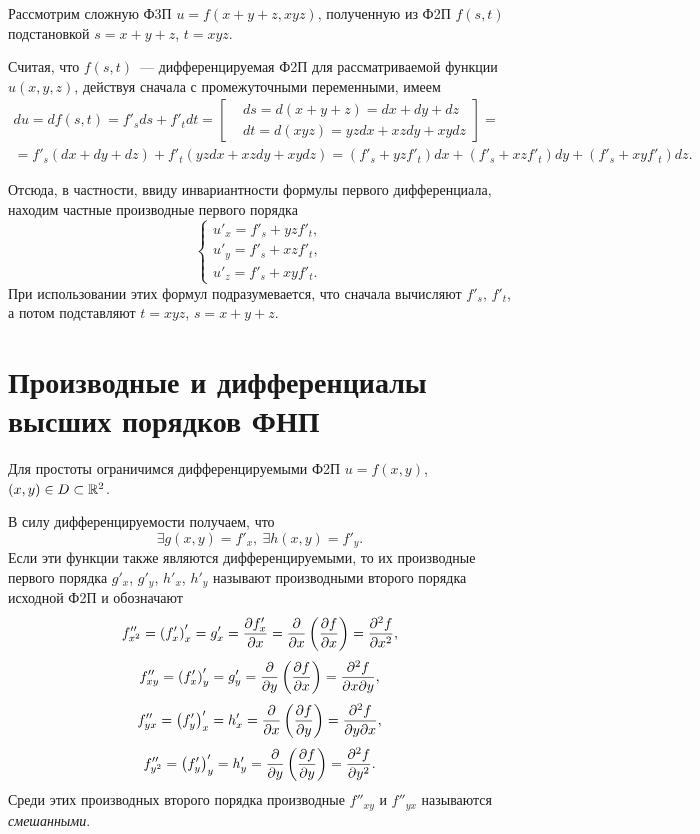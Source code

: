 \documentclass[../../main.tex]{subfiles}
\begin{document}
	\begin{exmp}
		Рассмотрим сложную Ф3П $u=f(x+y+z,xyz)$, полученную из Ф2П $f(s,t)$ 
		подстановкой $s=x+y+z$, $t=xyz$.
		
		Считая, что $f(s,t)$~--- дифференцируемая Ф2П для рассматриваемой 
		функции $u(x,y,z)$, действуя сначала с промежуточными переменными, имеем
		\begin{gather*}
			du = df(s,t) = f'_sds + f'_tdt = \left[\begin{aligned}
				& ds = d(x + y + z) = dx + dy + dz\\
				& dt = d(xyz) = yzdx + xzdy + xydz
			\end{aligned}\right] = \\
			= f'_s\left(dx + dy + dz\right) + 
			f'_t\left(yzdx + xzdy + xydz\right) = 
			\left(f'_s + yzf'_t\right)dx + 
			\left(f'_s + xzf'_t\right)dy + 
			\left(f'_s + xyf'_t\right)dz.
		\end{gather*}
		
		Отсюда, в частности, ввиду инвариантности формулы первого 
		дифференциала, находим частные производные первого порядка
		\[\begin{cases}
			u'_x = f'_s + yzf'_t,\\
			u'_y = f'_s + xzf'_t,\\
			u'_z = f'_s + xyf'_t.
		\end{cases}\]
		При использовании этих формул подразумевается, что сначала 
		вычисляют $f'_s$, $f'_t$, а потом подставляют 
		$t = xyz$, $s = x + y + z$.
	\end{exmp}

	\section{Производные и дифференциалы высших порядков ФНП}
	
	Для простоты ограничимся дифференцируемыми Ф2П $u=f(x,y)$, $(x,y)\in 
	D\subset \mathbb{R}^2$.
	
	В силу дифференцируемости получаем, что
	\[\exists g(x,y) = f'_x,\ \exists h(x,y) = f'_y.\]
	Если эти функции также являются дифференцируемыми, то их производные 
	первого порядка $g'_x$, $g'_y$, $h'_x$, $h'_y$ называют производными 
	второго порядка исходной Ф2П и обозначают 
	\[f''_{x^2} = \left(f'_x\right)'_x = g'_x = \frac{\partial f'_x}{\partial x} =
	 \frac{\partial }{\partial x}\left(\frac{\partial f}{\partial x}\right) = \frac{\partial ^2f}{\partial x^2},\]
	\[f''_{xy} = \left(f'_x\right)'_y = g'_y = 
	\frac{\partial }{\partial y}\left(\frac{\partial f}{\partial x}\right) = \frac{\partial ^2f}{\partial x\partial y},\]
	\[f''_{yx} = \left(f'_y\right)'_x = h'_x = 
	\frac{\partial }{\partial x}\left(\frac{\partial f}{\partial y}\right) = \frac{\partial ^2f}{\partial y\partial x},\]
	\[f''_{y^2} = \left(f'_y\right)'_y = h'_y = 
	\frac{\partial }{\partial y}\left(\frac{\partial f}{\partial y}\right) = \frac{\partial ^2f}{\partial y^2}.\]
	Среди этих производных второго порядка производные $f''_{xy}$ и 
	$f''_{yx}$ называются \emph{смешанными}.
	
\end{document}
